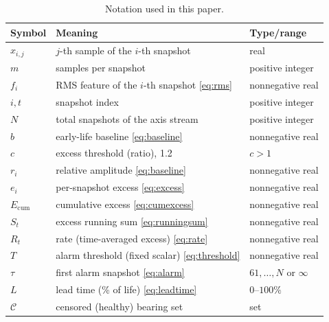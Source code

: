 \documentclass[journal]{IEEEtran}
\begin{document}
\begin{table}[!t]
\caption{Notation used in this paper.}
\label{tab:notation}
\centering
\begin{tabular}{l l l}
\toprule
Symbol & Meaning & Type/range\\
\midrule
$x_{i,j}$ & $j$-th sample of the $i$-th snapshot & real\\
$m$ & samples per snapshot & positive integer\\
$f_i$ & RMS feature of the $i$-th snapshot \eqref{eq:rms} & nonnegative real\\
$i,t$ & snapshot index & positive integer\\
$N$ & total snapshots of the axis stream & positive integer\\
$b$ & early-life baseline \eqref{eq:baseline} & nonnegative real\\
$c$ & excess threshold (ratio), 1.2 & $c>1$\\
$r_i$ & relative amplitude \eqref{eq:baseline} & nonnegative real\\
$e_i$ & per-snapshot excess \eqref{eq:excess} & nonnegative real\\
$E_{\mathrm{cum}}$ & cumulative excess \eqref{eq:cumexcess} & nonnegative real\\
$S_t$ & excess running sum \eqref{eq:runningsum} & nonnegative real\\
$R_t$ & rate (time-averaged excess) \eqref{eq:rate} & nonnegative real\\
$T$ & alarm threshold (fixed scalar) \eqref{eq:threshold} & nonnegative real\\
$\tau$ & first alarm snapshot \eqref{eq:alarm} & $61,\dots,N$ or $\infty$\\
$L$ & lead time (\% of life) \eqref{eq:leadtime} & $0$--$100\%$\\
$\mathcal{C}$ & censored (healthy) bearing set & set\\
\bottomrule
\end{tabular}
\end{table}
\end{document}
